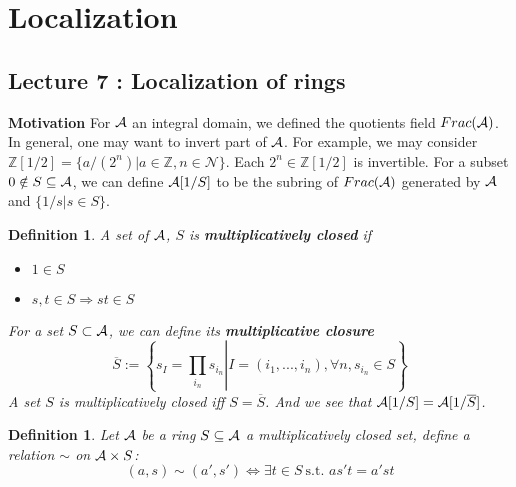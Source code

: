 \documentclass[11pt]{article}
\newtheorem{dfn}[thm]{Definition}
\newcommand{\intg}{\mathbb Z}
\newcommand{\cala}{{\cal A}}
\newcommand{\Lrta}{\Longrightarrow}
\begin{document}
\section{Localization}

\subsection{Lecture 7 : Localization of rings}
\textbf{Motivation}
For $\cala$ an integral domain, we defined the quotients field $Frac(\cala)$. In general, one may want to invert part of $\cala$. For example, we may consider $\intg[1/2]=\{a/(2^n)|a\in \intg, n\in \mathcal{N}\}$. Each $2^n\in \intg[1/2]$ is invertible. For a subset $0\notin S\subseteq \cala$, we can define $\cala[1/S]$ to be the subring of $Frac(\cala)$ generated by $\cala$ and $\{1/s|s\in S\}$.

\begin{dfn}
A set of $\cala$, $S$ is \textbf{multiplicatively closed} if 
\begin{itemize}
\item $1\in S$
\item $s,t\in S\Lrta st\in S$
\end{itemize}
For a set $S\subset \cala$, we can define its \textbf{multiplicative closure}
$$
\overline{S}:=\left\{s_{I}=\left. \prod_{i_n} s_{i_n}\right| I=(i_1,...,i_n), \forall{n},  s_{i_n}\in S\right\}
$$
A set $S$ is multiplicatively closed iff $S=\overline{S}$. And we see that $\cala[1/S]=\cala[1/\overline{S}]$.
\end{dfn}


\begin{dfn}
Let $\cala$ be a ring $S\subseteq \cala$ a multiplicatively closed set, define a relation $\sim $ on $\cala\times S$:
$$
(a,s)\sim(a',s')\Longleftrightarrow\exists t\in S \ \text{s.t. } as' t= a' st
$$
\end{dfn}
\end{document}
